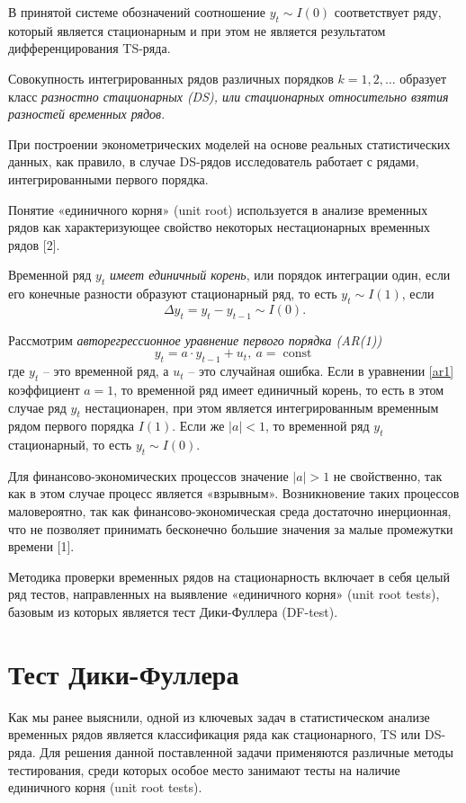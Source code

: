 \documentclass[a4paper, 14pt]{extreport}
\numberwithin{equation}{subsection}
\newcommand{\const}{\operatorname{const}}
\numberwithin{equation}{section}
\begin{document}
	В принятой системе обозначений соотношение $y_t\sim I(0)$ соответствует
	ряду, который является стационарным и при этом не является результатом
	дифференцирования TS-ряда.
	
	Совокупность интегрированных рядов различных порядков
	$k=1,2,\ldots$  образует класс \textit{разностно стационарных (DS), или стационарных относительно взятия  разностей временных рядов}.
	
	При построении эконометрических моделей на основе реальных
	статистических данных, как правило, в случае DS-рядов исследователь работает с
	рядами, интегрированными первого порядка.
	
	Понятие «единичного корня» (unit root) используется в анализе временных
	рядов как характеризующее свойство некоторых нестационарных временных рядов [2]. 
	
	Временной ряд $y_t$ \textit{имеет единичный корень}, или порядок интеграции один, если его конечные разности образуют стационарный ряд, то есть $y_t \sim I(1)$, если $$\Delta y_t = y_t - y_{t-1} \sim I(0).$$
	
	Рассмотрим \textit{авторегрессионное уравнение первого порядка (AR(1))}
	\begin{equation}
		y_t = a\cdot y_{t-1} + u_t,\ a = \const
		\label{ar1}
	\end{equation}
	где $y_t$ -- это временной ряд, а $u_t$ -- это случайная ошибка. Если в уравнении \eqref{ar1} коэффициент $a=1$, то временной ряд имеет единичный корень, то есть в этом случае ряд $y_t$ нестационарен, при этом является интегрированным временным рядом первого порядка $I(1)$. Если же $|a| < 1$, то временной ряд $y_t$ стационарный, то есть $y_t\sim I(0)$.
	
	Для финансово-экономических процессов значение 
	$|a|>1$ не свойственно, так как в этом случае процесс является «взрывным». Возникновение таких процессов маловероятно, так как финансово-экономическая среда достаточно инерционная, что не позволяет принимать бесконечно большие значения за малые промежутки времени [1].
	
	Методика проверки временных рядов на стационарность включает в себя целый
	ряд тестов, направленных на выявление «единичного корня» (unit root tests), базовым
	из которых является тест Дики-Фуллера (DF-test).
	\section{Тест Дики-Фуллера}
	Как мы ранее выяснили, одной из ключевых задач в статистическом анализе временных рядов является классификация ряда как стационарного, TS или DS-ряда. Для решения данной поставленной задачи применяются различные методы тестирования, среди которых особое место занимают тесты на наличие единичного корня (unit root tests).
	
\end{document}
